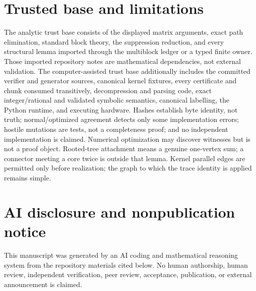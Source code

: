 \documentclass[11pt]{article}
\theoremstyle{definition}
\theoremstyle{remark}
\begin{document}
\section{Trusted base and limitations}

The analytic trust base consists of the displayed matrix arguments, exact path
elimination, standard block theory, the suppression reduction, and every
structural lemma imported through the multiblock ledger or a typed finite
owner.  Those imported repository notes are mathematical dependencies, not
external validation.  The computer-assisted trust base additionally includes the
committed verifier and generator sources, canonical kernel fixtures, every
certificate and chunk consumed transitively, decompression and parsing code,
exact integer/rational and validated symbolic semantics, canonical labelling,
the Python runtime, and executing hardware.  Hashes establish byte identity,
not truth; normal/optimized agreement detects only some implementation errors;
hostile mutations are tests, not a completeness proof; and no independent
implementation is claimed.  Numerical optimization may discover witnesses but
is not a proof object.  Rooted-tree attachment means a genuine one-vertex sum;
a connector meeting a core twice is outside that lemma.  Kernel parallel edges
are permitted only before realization; the graph to which the trace identity
is applied remains simple.

\section*{AI disclosure and nonpublication notice}

This manuscript was generated by an AI coding and mathematical reasoning system
from the repository materials cited below.  No human authorship, human review,
independent verification, peer review, acceptance, publication, or external
announcement is claimed.
\end{document}
